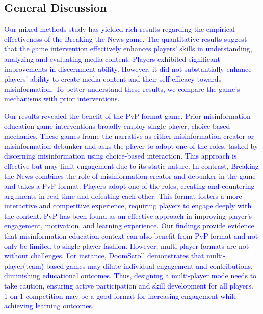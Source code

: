\subsection{General Discussion}
 
\textcolor{blue}{Our mixed-methods study has yielded rich results regarding the empirical effectiveness of the Breaking the News game. The quantitative results suggest that the game intervention effectively enhances players' skills in understanding, analyzing and evaluating media content. Players exhibited significant improvements in discernment ability. However, it did not substantially enhance players’ ability to create media content and their self-efficacy towards misinformation. To better understand these results, we compare the game’s mechanisms with prior interventions. }

\textcolor{blue}{Our results revealed the benefit of the PvP format game. Prior misinformation education game interventions broadly employ single-player, choice-based mechanics\cite{roozenbeek2019fake,camCambridgeGame,harmonysquare,jeon2021chamberbreaker}. These games frame the narrative as either misinformation creator or misinformation debunker and asks the player to adopt one of the roles, tasked by discerning misinformation using choice-based interaction. This approach is effective but may limit engagement due to its static nature. In contrast, Breaking the News combines the role of misinformation creator and debunker in the game and takes a PvP format. Players adopt one of the roles, creating and countering arguments in real-time and defeating each other. This format fosters a more interactive and competitive experience, requiring players to engage deeply with the content. PvP has been found as an effective approach in improving player’s engagement, motivation, and learning experience\cite{cagiltay2015effect,foster2013competition}. Our findings provide evidence that misinformation education context can also benefit from PvP format and not only be limited to single-player fashion. However, multi-player formats are not without challenges. For instance, DoomScroll demonstrates that multi-player(team) based games may dilute individual engagement and contributions, diminishing educational outcomes\cite{wells2024doomscroll}. Thus, designing a multi-player mode needs to take caution, ensuring active participation and skill development for all players. 1-on-1 competition may be a good format for increasing engagement while achieving learning outcomes.}


